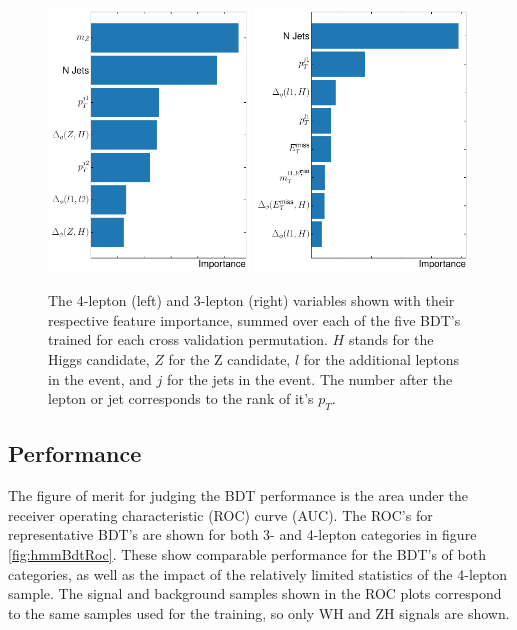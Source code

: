 \begin{figure}[htpb]
  \centering
  \includegraphics[height=7cm]{figures/hmm/bdtImportance/imp-4lep.pdf}
  \includegraphics[height=7cm]{figures/hmm/bdtImportance/imp-3lep.pdf}
  \caption{The 4-lepton (left) and 3-lepton (right) variables shown with their respective feature importance, summed over each of the five BDT's trained for each cross validation permutation. $H$ stands for the Higgs candidate, $Z$ for the Z candidate, $l$ for the additional leptons in the event, and $j$ for the jets in the event. The number after the lepton or jet corresponds to the rank of it's $p_T$.}
    \label{fig:hmmVarImport}
\end{figure}

\clearpage

\subsection{Performance}
\label{sec:hmmBdtPerform}

The figure of merit for judging the BDT performance is the area under the receiver operating characteristic (ROC) curve (AUC). The ROC's for representative BDT's are shown for both 3- and 4-lepton categories in figure \ref{fig:hmmBdtRoc}. These show comparable performance for the BDT's of both categories, as well as the impact of the relatively limited statistics of the 4-lepton sample. The signal and background samples shown in the ROC plots correspond to the same samples used for the training, so only WH and ZH signals are shown.

